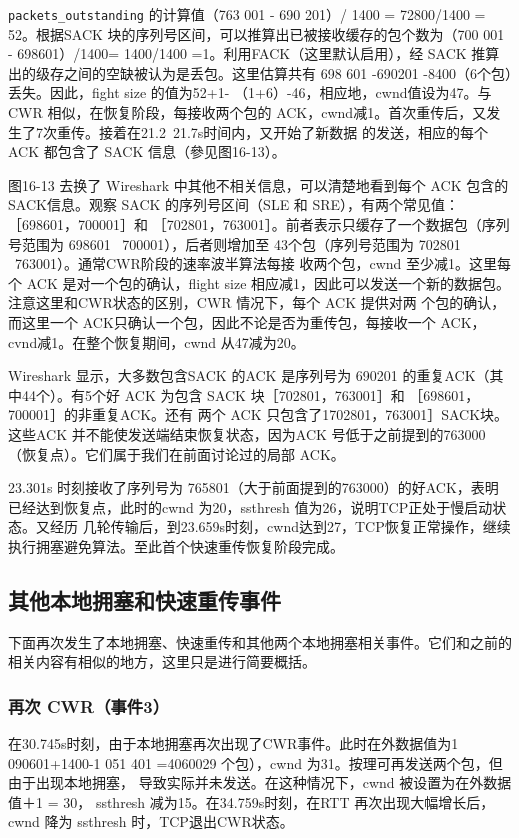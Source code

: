 \verb|packets_outstanding| 的计算值（763 001 - 690 201）/ 1400 = 72800/1400 = 52。根据SACK 块的序列号区间，可以推算出已被接收缓存的包个数为（700 001 - 698601）/1400=
1400/1400 =1。利用FACK（这里默认启用），经 SACK 推算出的级存之间的空缺被认为是丢包。这里估算共有 698 601 -690201 -8400（6个包）丢失。因此，fight size 的值为52+1-
（1+6）-46，相应地，cwnd值设为47。与CWR 相似，在恢复阶段，每接收两个包的 ACK，cwnd减1。首次重传后，又发生了7次重传。接着在21.2~21.7s时间内，又开始了新数据
的发送，相应的每个 ACK 都包含了 SACK 信息（參见图16-13）。

图16-13 去换了 Wireshark 中其他不相关信息，可以清楚地看到每个 ACK 包含的SACK信息。观察 SACK 的序列号区间（SLE 和 SRE），有两个常见值：［698601，700001］和
［702801，763001］。前者表示只缓存了一个数据包（序列号范围为 698601 ~700001），后者则增加至 43个包（序列号范围为 702801 ~763001）。通常CWR阶段的速率波半算法每接
收两个包，cwnd 至少减1。这里每个 ACK 是对一个包的确认，flight size 相应减1，因此可以发送一个新的数据包。注意这里和CWR状态的区别，CWR 情况下，每个 ACK 提供对两
个包的确认，而这里一个 ACK只确认一个包，因此不论是否为重传包，每接收一个 ACK，cvnd减1。在整个恢复期间，cwnd 从47减为20。

Wireshark 显示，大多数包含SACK 的ACK 是序列号为 690201 的重复ACK（其中44个）。有5个好 ACK 为包含 SACK 块［702801，763001］和 ［698601，700001］的非重复ACK。还有
两个 ACK 只包含了1702801，763001］SACK块。这些ACK 并不能使发送端结束恢复状态，因为ACK 号低于之前提到的763000（恢复点）。它们属于我们在前面讨论过的局部 ACK。

23.301s 时刻接收了序列号为 765801（大于前面提到的763000）的好ACK，表明已经达到恢复点，此时的cwnd 为20，ssthresh 值为26，说明TCP正处于慢启动状态。又经历
几轮传输后，到23.659s时刻，cwnd达到27，TCP恢复正常操作，继续执行拥塞避免算法。至此首个快速重传恢复阶段完成。

\subsection{其他本地拥塞和快速重传事件}
下面再次发生了本地拥塞、快速重传和其他两个本地拥塞相关事件。它们和之前的相关内容有相似的地方，这里只是进行简要概括。

\subsubsection{再次 CWR（事件3）}
在30.745s时刻，由于本地拥塞再次出现了CWR事件。此时在外数据值为1 090601+1400-1 051 401 =4060029 个包），cwnd 为31。按理可再发送两个包，但由于出现本地拥塞，
导致实际并未发送。在这种情况下，cwnd 被设置为在外数据值＋1 = 30， ssthresh 减为15。在34.759s时刻，在RTT 再次出现大幅增长后，cwnd 降为 ssthresh 时，TCP退出CWR状态。

